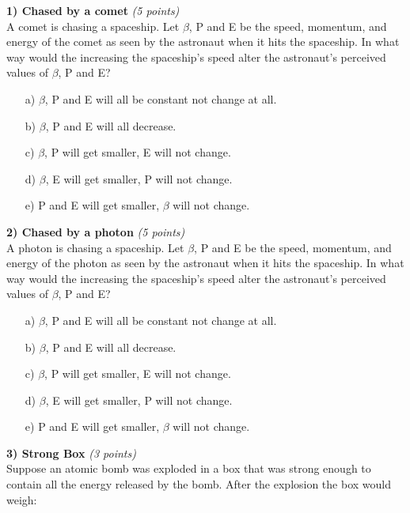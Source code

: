 {\large


\textbf{1) Chased by a comet }\hfill \textit{(5 points)}\\
A comet is chasing a spaceship.
Let $\beta$, P and E be the speed, momentum, and energy of the comet as seen by the astronaut when it hits the spaceship. 
In what way would the increasing the spaceship's speed alter the astronaut's perceived values of $\beta$, P and E?

\begin{itemize}
\item[a)] $\beta$, P and E will all be constant not change at all.
\item[b)] $\beta$, P and E will all decrease.
\item[c)] $\beta$, P will get smaller, E will not change.
\item[d)] $\beta$, E will get smaller, P will not change.
\item[e)] P and E will get smaller, $\beta$ will not change.
\end{itemize}

\vspace{0.5in}

\textbf{2) Chased by a photon }\hfill \textit{(5 points)}\\
A photon is chasing a spaceship.
Let $\beta$, P and E be the speed, momentum, and energy of the photon as seen by the astronaut when it hits the spaceship. 
In what way would the increasing the spaceship's speed alter the astronaut's perceived values of $\beta$, P and E?

\begin{itemize}
\item[a)] $\beta$, P and E will all be constant not change at all.
\item[b)] $\beta$, P and E will all decrease.
\item[c)] $\beta$, P will get smaller, E will not change.
\item[d)] $\beta$, E will get smaller, P will not change.
\item[e)] P and E will get smaller, $\beta$ will not change.
\end{itemize}

\vspace{0.5in}

\textbf{3) Strong Box }\hfill \textit{(3 points)}\\
Suppose an atomic bomb was exploded in a box that was strong enough to contain all the energy released by the bomb.
After the explosion the box would weigh:

}
